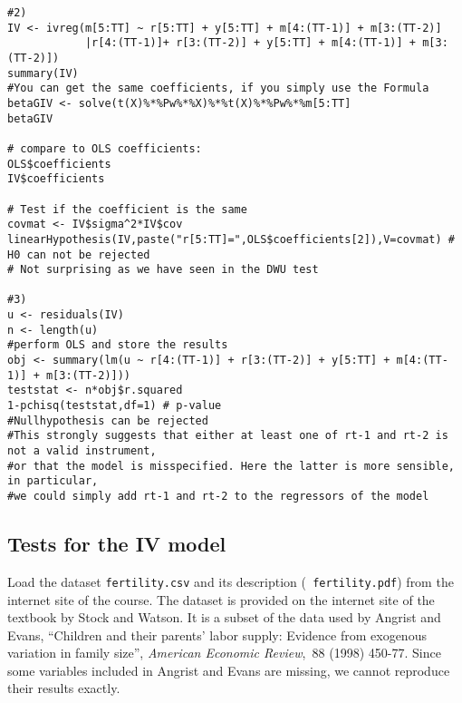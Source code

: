 \documentclass{article}
\begin{document}
\begin{solution}
\begin{verbatim}
#2)
IV <- ivreg(m[5:TT] ~ r[5:TT] + y[5:TT] + m[4:(TT-1)] + m[3:(TT-2)]
            |r[4:(TT-1)]+ r[3:(TT-2)] + y[5:TT] + m[4:(TT-1)] + m[3:(TT-2)])
summary(IV)
#You can get the same coefficients, if you simply use the Formula
betaGIV <- solve(t(X)%*%Pw%*%X)%*%t(X)%*%Pw%*%m[5:TT]
betaGIV

# compare to OLS coefficients:
OLS$coefficients
IV$coefficients

# Test if the coefficient is the same
covmat <- IV$sigma^2*IV$cov
linearHypothesis(IV,paste("r[5:TT]=",OLS$coefficients[2]),V=covmat) # H0 can not be rejected
# Not surprising as we have seen in the DWU test

#3)
u <- residuals(IV)
n <- length(u)
#perform OLS and store the results
obj <- summary(lm(u ~ r[4:(TT-1)] + r[3:(TT-2)] + y[5:TT] + m[4:(TT-1)] + m[3:(TT-2)]))
teststat <- n*obj$r.squared
1-pchisq(teststat,df=1) # p-value
#Nullhypothesis can be rejected
#This strongly suggests that either at least one of rt-1 and rt-2 is not a valid instrument,
#or that the model is misspecified. Here the latter is more sensible, in particular,
#we could simply add rt-1 and rt-2 to the regressors of the model
\end{verbatim}
\end{solution}

\subsection{Tests for the IV model}

Load the dataset \texttt{fertility.csv} and its description (\texttt{%
fertility.pdf}) from the internet site of the course. The dataset is
provided on the internet site of the textbook by Stock and Watson. It is a
subset of the data used by Angrist and Evans, \textquotedblleft Children and
their parents' labor supply: Evidence from exogenous variation in family
size\textquotedblright , \emph{American Economic Review},\emph{\ }88 (1998)
450-77. Since some variables included in Angrist and Evans are missing, we
cannot reproduce their results exactly.
\end{document}
